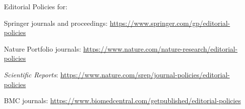 \documentclass[pdflatex,sn-apa]{sn-jnl}%
\begin{document}
\bigskip
\begin{flushleft}%
Editorial Policies for:

\bigskip\noindent
Springer journals and proceedings: \url{https://www.springer.com/gp/editorial-policies}

\bigskip\noindent
Nature Portfolio journals: \url{https://www.nature.com/nature-research/editorial-policies}

\bigskip\noindent
\textit{Scientific Reports}: \url{https://www.nature.com/srep/journal-policies/editorial-policies}

\bigskip\noindent
BMC journals: \url{https://www.biomedcentral.com/getpublished/editorial-policies}
\end{flushleft}
\end{document}
